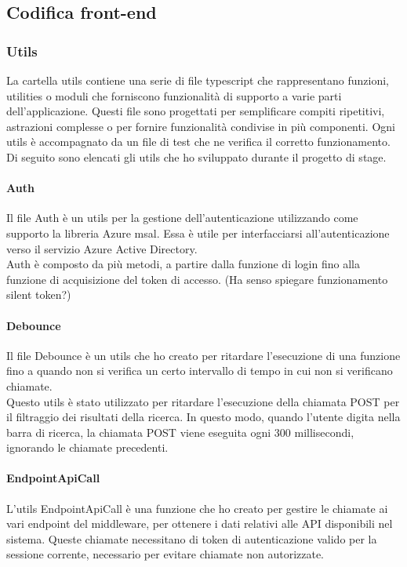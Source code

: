 \subsection{Codifica front-end}\label{subsec:codifica-front-end}

\subsubsection{Utils}\label{subsubsec:utils}
La cartella utils contiene una serie di file typescript che rappresentano funzioni, utilities o moduli che forniscono funzionalità di supporto a varie parti dell'applicazione.
Questi file sono progettati per semplificare compiti ripetitivi, astrazioni complesse o per fornire funzionalità condivise in più componenti. Ogni utils è accompagnato 
da un file di test che ne verifica il corretto funzionamento.\\
Di seguito sono elencati gli utils che ho sviluppato durante il progetto di stage.

\paragraph{Auth}\label{par:auth-utils}
Il file Auth è un utils per la gestione dell'autenticazione utilizzando come supporto la libreria Azure msal. Essa è utile
per interfacciarsi all'autenticazione verso il servizio Azure Active Directory.\\
Auth è composto da più metodi, a partire dalla funzione di login fino alla funzione di acquisizione del token di accesso.
(Ha senso spiegare funzionamento silent token?)

\paragraph{Debounce}\label{par:debounce}
Il file Debounce è un utils che ho creato per ritardare l'esecuzione di una funzione fino a quando non si verifica
un certo intervallo di tempo in cui non si verificano chiamate.\\
Questo utils è stato utilizzato per ritardare l'esecuzione della chiamata POST per il filtraggio dei risultati della ricerca. 
In questo modo, quando l'utente digita nella barra di ricerca, la chiamata POST viene eseguita ogni 300 millisecondi, ignorando le chiamate precedenti.

\paragraph{EndpointApiCall}\label{par:endpoint-api-call}
L'utils EndpointApiCall è una funzione che ho creato per gestire le chiamate ai vari endpoint del middleware, per ottenere
i dati relativi alle API disponibili nel sistema.
Queste chiamate necessitano di token di autenticazione valido per la sessione corrente, necessario per evitare chiamate non autorizzate.

